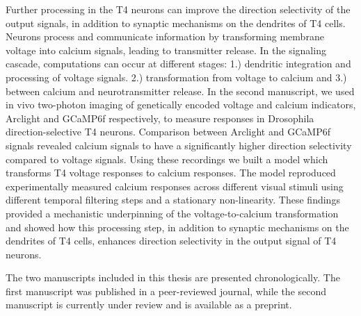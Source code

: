 Further processing in the T4 neurons can improve the direction selectivity of the output signals, in addition to synaptic mechanisms on the dendrites of T4 cells. Neurons process and communicate information by transforming membrane voltage into calcium signals, leading to transmitter release. In the signaling cascade, computations can occur at different stages: 1.) dendritic integration and processing of voltage signals. 2.) transformation from voltage to calcium and 3.) between calcium and neurotransmitter release. In the second manuscript, we used in vivo two-photon imaging of genetically encoded voltage and calcium indicators, Arclight and GCaMP6f respectively, to measure responses in Drosophila direction-selective T4 neurons. Comparison between Arclight and GCaMP6f signals revealed calcium signals to have a significantly higher direction selectivity compared to voltage signals. Using these recordings we built a model which transforms T4 voltage responses to calcium responses. The model reproduced experimentally measured calcium responses across different visual stimuli using different temporal filtering steps and a stationary non-linearity. These findings provided a mechanistic underpinning of the voltage-to-calcium transformation and showed how this processing step, in addition to synaptic mechanisms on the dendrites of T4 cells, enhances direction selectivity in the output signal of T4 neurons.

The two manuscripts included in this thesis are presented chronologically. The first manuscript was published in a peer-reviewed journal, while the second manuscript is currently under review and is available as a preprint. 


% 


\vfill


\endgroup			

\vfill

